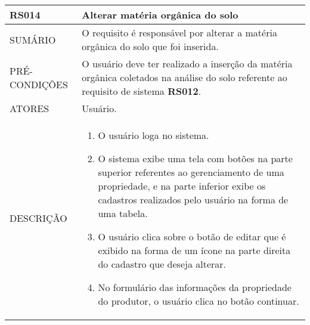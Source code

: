 \begin{longtable}[c]{@{}|p{4cm}|p{9cm}|@{}}
\hline
\begin{minipage}[t]{0.47\columnwidth}
\textbf{RS014}
\end{minipage} & \begin{minipage}[t]{0.47\columnwidth}
Alterar matéria orgânica do solo
\end{minipage}
\\\hline
\begin{minipage}[t]{0.47\columnwidth}
SUMÁRIO
\end{minipage} & \begin{minipage}[t]{0.47\columnwidth}
O requisito é responsável por alterar a matéria orgânica do solo que foi
inserida.
\end{minipage}
\\\hline
\begin{minipage}[t]{0.47\columnwidth}
PRÉ-CONDIÇÕES
\end{minipage} & \begin{minipage}[t]{0.47\columnwidth}
O usuário deve ter realizado a inserção da matéria orgânica coletados na
análise do solo referente ao requisito de sistema \textbf{RS012}.
\end{minipage}
\\\hline
\begin{minipage}[t]{0.47\columnwidth}
ATORES
\end{minipage} & \begin{minipage}[t]{0.47\columnwidth}
Usuário.
\end{minipage}
\\\hline
\begin{minipage}[t]{0.47\columnwidth}
DESCRIÇÃO
\end{minipage} & \begin{minipage}[t]{0.47\columnwidth}
\begin{enumerate}
\def\labelenumi{\arabic{enumi}.}
\item
  O usuário loga no sistema.
\item
  O sistema exibe uma tela com botões na parte superior referentes ao
  gerenciamento de uma propriedade, e na parte inferior exibe os
  cadastros realizados pelo usuário na forma de uma tabela.
\item
  O usuário clica sobre o botão de editar que é exibido na forma de um
  ícone na parte direita do cadastro que deseja alterar.
\item
  No formulário das informações da propriedade do produtor, o usuário
  clica no botão continuar.

\end{enumerate}
\end{minipage}
\end{longtable}
